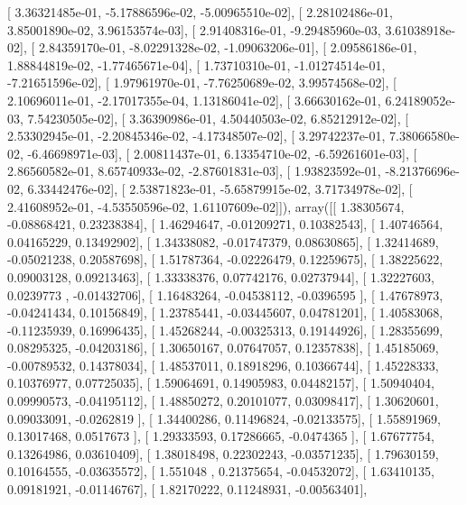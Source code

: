\documentclass{article}
\begin{document}
       [  3.36321485e-01,  -5.17886596e-02,  -5.00965510e-02],
       [  2.28102486e-01,   3.85001890e-02,   3.96153574e-03],
       [  2.91408316e-01,  -9.29485960e-03,   3.61038918e-02],
       [  2.84359170e-01,  -8.02291328e-02,  -1.09063206e-01],
       [  2.09586186e-01,   1.88844819e-02,  -1.77465671e-04],
       [  1.73710310e-01,  -1.01274514e-01,  -7.21651596e-02],
       [  1.97961970e-01,  -7.76250689e-02,   3.99574568e-02],
       [  2.10696011e-01,  -2.17017355e-04,   1.13186041e-02],
       [  3.66630162e-01,   6.24189052e-03,   7.54230505e-02],
       [  3.36390986e-01,   4.50440503e-02,   6.85212912e-02],
       [  2.53302945e-01,  -2.20845346e-02,  -4.17348507e-02],
       [  3.29742237e-01,   7.38066580e-02,  -6.46698971e-03],
       [  2.00811437e-01,   6.13354710e-02,  -6.59261601e-03],
       [  2.86560582e-01,   8.65740933e-02,  -2.87601831e-03],
       [  1.93823592e-01,  -8.21376696e-02,   6.33442476e-02],
       [  2.53871823e-01,  -5.65879915e-02,   3.71734978e-02],
       [  2.41608952e-01,  -4.53550596e-02,   1.61107609e-02]]), array([[ 1.38305674, -0.08868421,  0.23238384],
       [ 1.46294647, -0.01209271,  0.10382543],
       [ 1.40746564,  0.04165229,  0.13492902],
       [ 1.34338082, -0.01747379,  0.08630865],
       [ 1.32414689, -0.05021238,  0.20587698],
       [ 1.51787364, -0.02226479,  0.12259675],
       [ 1.38225622,  0.09003128,  0.09213463],
       [ 1.33338376,  0.07742176,  0.02737944],
       [ 1.32227603,  0.0239773 , -0.01432706],
       [ 1.16483264, -0.04538112, -0.0396595 ],
       [ 1.47678973, -0.04241434,  0.10156849],
       [ 1.23785441, -0.03445607,  0.04781201],
       [ 1.40583068, -0.11235939,  0.16996435],
       [ 1.45268244, -0.00325313,  0.19144926],
       [ 1.28355699,  0.08295325, -0.04203186],
       [ 1.30650167,  0.07647057,  0.12357838],
       [ 1.45185069, -0.00789532,  0.14378034],
       [ 1.48537011,  0.18918296,  0.10366744],
       [ 1.45228333,  0.10376977,  0.07725035],
       [ 1.59064691,  0.14905983,  0.04482157],
       [ 1.50940404,  0.09990573, -0.04195112],
       [ 1.48850272,  0.20101077,  0.03098417],
       [ 1.30620601,  0.09033091, -0.0262819 ],
       [ 1.34400286,  0.11496824, -0.02133575],
       [ 1.55891969,  0.13017468,  0.0517673 ],
       [ 1.29333593,  0.17286665, -0.0474365 ],
       [ 1.67677754,  0.13264986,  0.03610409],
       [ 1.38018498,  0.22302243, -0.03571235],
       [ 1.79630159,  0.10164555, -0.03635572],
       [ 1.551048  ,  0.21375654, -0.04532072],
       [ 1.63410135,  0.09181921, -0.01146767],
       [ 1.82170222,  0.11248931, -0.00563401],
\end{document}

